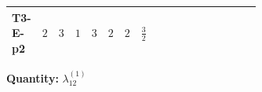 \documentclass[8pt]{article}
\begin{document}
\begin{landscape}
\begin{longtable}{@{}llcccccc >{\raggedright\arraybackslash}p{0.21\linewidth} >{\raggedright\arraybackslash}p{0.21\linewidth} >{\raggedright\arraybackslash}p{0.21\linewidth}@{}}
\midrule
T3-E-p2 & $2$ & $3$ & $1$ & $3$ & $2$ & $2$ & $\frac{3}{2}$ & \scriptsize\adjustbox{max width=\linewidth}{$\begin{gathered} +\frac{4}{3} {\lambda_5} \left({\lambda_5}\right)^{*}\end{gathered}$} & \scriptsize\adjustbox{max width=\linewidth}{$\begin{gathered} +16 {g_2}^4\end{gathered}$} & \scriptsize\adjustbox{max width=\linewidth}{$\begin{gathered} +{g_2}^2 (-24 {\lambda_{12}^{(1)}}-16 {\lambda_{12}^{(\times)}})\end{gathered}$} \\
\midrule
\bottomrule
\end{longtable}
\clearpage
\noindent\textbf{Quantity: }$\lambda_{12}^{(1)}$\par\smallskip

\end{landscape}
\end{document}
